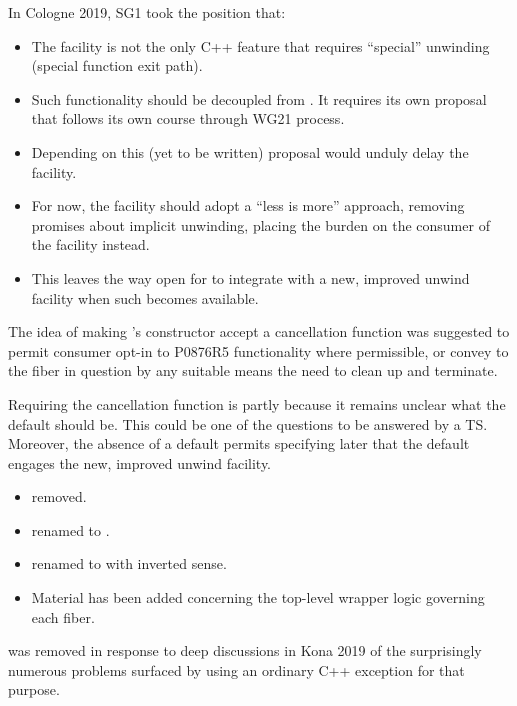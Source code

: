 In Cologne 2019, SG1 took the position that:

\begin{itemize}
    \item The  facility is not the only C++ feature that
          requires ``special'' unwinding (special function exit path).
    \item Such functionality should be decoupled from \fiber. It requires its
          own proposal that follows its own course through WG21 process.
    \item Depending on this (yet to be written) proposal would unduly delay
          the  facility.
    \item For now, the  facility should adopt a ``less is
          more'' approach, removing promises about implicit unwinding, placing
          the burden on the consumer of the facility instead.
    \item This leaves the way open for  to integrate with
          a new, improved unwind facility when such becomes available.
\end{itemize}

The idea of making \fiber's constructor accept a cancellation function was
suggested to permit consumer opt-in to P0876R5 functionality where
permissible, or convey to the fiber in question by any suitable means the need
to clean up and terminate.

Requiring the cancellation function is partly because it remains unclear what
the default should be. This could be one of the questions to be answered by a
TS. Moreover, the absence of a default permits specifying later that the
default engages the new, improved unwind facility.


\begin{itemize}
    \item {} removed.
    \item {} renamed to
      \canxtresume.
    \item {} renamed to  with inverted
      sense.
    \item Material has been added concerning the top-level wrapper
      logic governing each fiber.
\end{itemize}

\unwindex was removed in response to deep
discussions in Kona 2019 of the surprisingly numerous problems surfaced by
using an ordinary C++ exception for that purpose.


